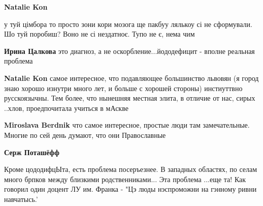 \begin{itemize}
\begin{itemize}
 
\textbf{Natalie Kon} 

у туй цімбора то просто зони кори мозога ще пакбуу лялькоу сі не сформували. Шо
туй поробиш? Воно не сі нездатноє. Тупо не є, нема чим

 
\textbf{Ирина Цалкова} это диагноз, а не оскорбление...йододефицит - вполне реальная проблема

 
\textbf{Natalie Kon} самое интересное, что подавляющее большинство львовян (я
город знаю хорошо изнутри много лет, и больше с хорошей стороны) инстиуттвно
русскоязычны. Тем более, что нынешняя местная элита, в отличие от нас, сирых
..хлов, проедпочитала учиться в мАскве

 
\textbf{Miroslava Berdnik} что самое интересное, простые люди там замечательные. Многие по сей день думают, что они Православные

 
\textbf{Серж Поташёфф} 

Кроме цододифцЫта, есть проблема посеръезнее. В западных областях, по селам
много брпков между близкими родственниками... Эта проблема ...еще та! Как
говорил один доцент ЛУ им. Франка - "Цэ люды нэспроможни на гэнному ривни
навчатысь.'


\end{itemize}
\end{itemize}
